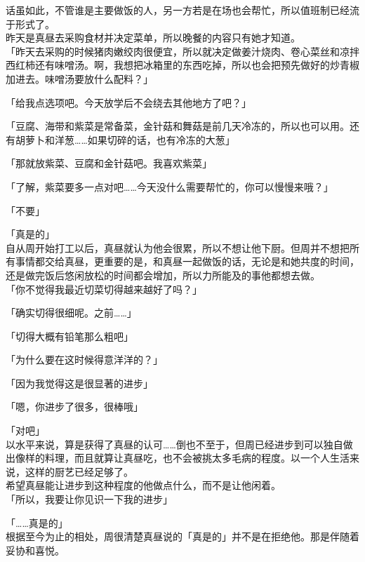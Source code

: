 话虽如此，不管谁是主要做饭的人，另一方若是在场也会帮忙，所以值班制已经流于形式了。\\

昨天是真昼去采购食材并决定菜单，所以晚餐的内容只有她才知道。\\

「昨天去采购的时候猪肉嫩绞肉很便宜，所以就决定做姜汁烧肉、卷心菜丝和凉拌西红柿还有味噌汤。啊，我想把冰箱里的东西吃掉，所以也会把预先做好的炒青椒加进去。味噌汤要放什么配料？」

「给我点选项吧。今天放学后不会绕去其他地方了吧？」

「豆腐、海带和紫菜是常备菜，金针菇和舞菇是前几天冷冻的，所以也可以用。还有胡萝卜和洋葱……如果切碎的话，也有冷冻的大葱」

「那就放紫菜、豆腐和金针菇吧。我喜欢紫菜」

「了解，紫菜要多一点对吧……今天没什么需要帮忙的，你可以慢慢来哦？」

「不要」

「真是的」\\

自从周开始打工以后，真昼就认为他会很累，所以不想让他下厨。但周并不想把所有事情都交给真昼，更重要的是，和真昼一起做饭的话，无论是和她共度的时间，还是做完饭后悠闲放松的时间都会增加，所以力所能及的事他都想去做。\\

「你不觉得我最近切菜切得越来越好了吗？」

「确实切得很细呢。之前……」

「切得大概有铅笔那么粗吧」

「为什么要在这时候得意洋洋的？」

「因为我觉得这是很显著的进步」

「嗯，你进步了很多，很棒哦」

「对吧」\\

以水平来说，算是获得了真昼的认可……倒也不至于，但周已经进步到可以独自做出像样的料理，而且就算让真昼吃，也不会被挑太多毛病的程度。以一个人生活来说，这样的厨艺已经足够了。\\

希望真昼能让进步到这种程度的他做点什么，而不是让他闲着。\\

「所以，我要让你见识一下我的进步」

「……真是的」\\

根据至今为止的相处，周很清楚真昼说的「真是的」并不是在拒绝他。那是伴随着妥协和喜悦。\\

